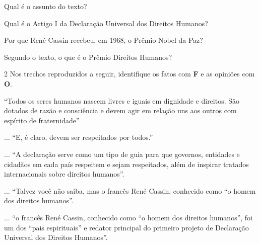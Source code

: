 \begin{escolha}
\item Qual é o assunto do texto?


\item Qual é o Artigo I da Declaração Universal dos Direitos Humanos?


\item Por que René Cassin recebeu, em 1968, o Prêmio Nobel da Paz?


\item Segundo o texto, o que é o Prêmio Direitos Humanos?

\end{escolha}

\num{2} Nos trechos reproduzidos a seguir, identifique os fatos com \textbf{F}
e as opiniões com \textbf{O}.


\begin{boxlist}
\boxitem[\rosa{F}] ``Todos os seres humanos nascem livres e iguais em
dignidade e direitos. São dotados de razão e consciência e devem agir 
em relação uns aos outros com espírito de fraternidade''

\boxitem[\rosa{O}] ... ``E, é claro, devem ser respeitados por todos.''

\boxitem[\rosa{O}] ... ``A declaração serve como um tipo de guia para que
governos, entidades e cidadãos em cada país respeitem e sejam respeitados,
além de inspirar tratados internacionais sobre direitos humanos''.

\boxitem[\rosa{O}] ... ``Talvez você não saiba, mas o francês René Cassin,
conhecido como ``o homem dos direitos humanos''.

\boxitem[\rosa{F}] ... ``o francês René Cassin, conhecido como ``o homem 
dos direitos humanos'', foi um dos ``pais espirituais'' e redator principal do
primeiro projeto de Declaração Universal dos Direitos Humanos''.
\end{boxlist}

